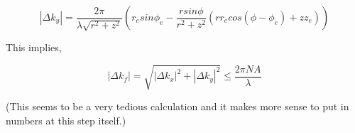 \documentclass[11pt]{article}
\begin{document}
\begin{equation*}
|\Delta k_y| = \frac{2 \pi}{\lambda \sqrt{r^2+z^2}} \left(r_e sin \phi _e - \frac{r sin \phi }{r^2+z^2} (rr_e cos(\phi - \phi _e)+zz_e)\right)
\end{equation*}

This implies, 

\begin{equation*}
|\Delta k_f| = \sqrt{|\Delta k_x|^2 + |\Delta k_y|^2} \leq \frac{2 \pi NA}{\lambda}
\end{equation*}

(This seems to be a very tedious calculation and it makes more sense to put in numbers at this step itself.)
\end{document}
